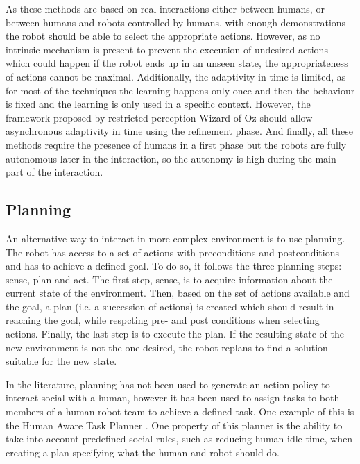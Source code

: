     As these methods are based on real interactions either between humans, or between humans and robots controlled by humans, with enough demonstrations the robot should be able to select the appropriate actions. However, as no intrinsic mechanism is present to prevent the execution of undesired actions which could happen if the robot ends up in an unseen state, the appropriateness of actions cannot be maximal. Additionally, the adaptivity in time is limited, as for most of the techniques the learning happens only once and then the behaviour is fixed and the learning is only used in a specific context. However, the framework proposed by restricted-perception Wizard of Oz should allow asynchronous adaptivity in time using the refinement phase. And finally, all these methods require the presence of humans in a first phase but the robots are fully autonomous later in the interaction, so the autonomy is high during the main part of the interaction.
    
\subsection{Planning} \label{ssec:planning}
    
    An alternative way to interact in more complex environment is to use planning. The robot has access to a set of actions with preconditions and postconditions and has to achieve a defined goal. To do so, it follows the three planning steps: sense, plan and act. The first step, sense, is to acquire information about the current state of the environment. Then, based on the set of actions available and the goal, a plan (i.e. a succession of actions) is created which should result in reaching the goal, while respcting pre- and post conditions when selecting actions. Finally, the last step is to execute the plan. If the resulting state of the new environment is not the one desired, the robot replans to find a solution suitable for the new state.
    
    
    In the literature, planning has not been used to generate an action policy to interact social with a human, however it has been used to assign tasks to both members of a human-robot team to achieve a defined task. One example of this is the Human Aware Task Planner \citep{alili2009task}. One property of this planner is the ability to take into account predefined social rules, such as reducing human idle time, when creating a plan specifying what the human and robot should do.
    
